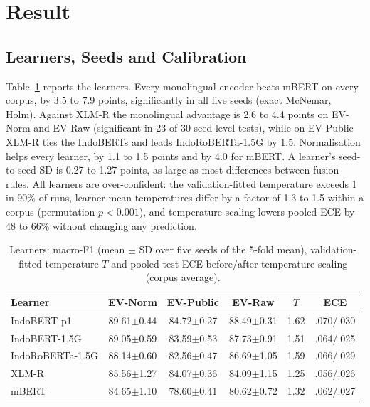 \documentclass[conference,a4paper]{IEEEtran}
\begin{document}
\section{Result}
\label{sec:result}

\subsection{Learners, Seeds and Calibration}
Table~\ref{tab:single} reports the learners. Every monolingual encoder beats mBERT on every corpus, by 3.5 to 7.9 points, significantly in all five seeds (exact McNemar, Holm). Against XLM-R the monolingual advantage is 2.6 to 4.4 points on EV-Norm and EV-Raw (significant in 23 of 30 seed-level tests), while on EV-Public XLM-R ties the IndoBERTs and leads IndoRoBERTa-1.5G by 1.5. Normalisation helps every learner, by 1.1 to 1.5 points and by 4.0 for mBERT. A learner's seed-to-seed SD is 0.27 to 1.27 points, as large as most differences between fusion rules. All learners are over-confident: the validation-fitted temperature exceeds 1 in 90\% of runs, learner-mean temperatures differ by a factor of 1.3 to 1.5 within a corpus (permutation $p<0.001$), and temperature scaling lowers pooled ECE by 48 to 66\% without changing any prediction.

\begin{table}[t]
\caption{Learners: macro-F1 (mean $\pm$ SD over five seeds of the 5-fold mean), validation-fitted temperature $T$ and pooled test ECE before/after temperature scaling (corpus average).}
\label{tab:single}
\centering
\footnotesize
\setlength{\tabcolsep}{2.2pt}
\begin{tabular}{lccccc}
\toprule
Learner & EV-Norm & EV-Public & EV-Raw & $T$ & ECE \\
\midrule
IndoBERT-p1      & 89.61$\pm$0.44 & 84.72$\pm$0.27 & 88.49$\pm$0.31 & 1.62 & .070/.030 \\
IndoBERT-1.5G    & 89.05$\pm$0.59 & 83.59$\pm$0.53 & 87.73$\pm$0.91 & 1.51 & .064/.025 \\
IndoRoBERTa-1.5G & 88.14$\pm$0.60 & 82.56$\pm$0.47 & 86.69$\pm$1.05 & 1.59 & .066/.029 \\
XLM-R            & 85.56$\pm$1.27 & 84.07$\pm$0.36 & 84.09$\pm$1.15 & 1.25 & .056/.026 \\
mBERT            & 84.65$\pm$1.10 & 78.60$\pm$0.41 & 80.62$\pm$0.72 & 1.32 & .062/.027 \\
\bottomrule
\end{tabular}
\end{table}
\end{document}

